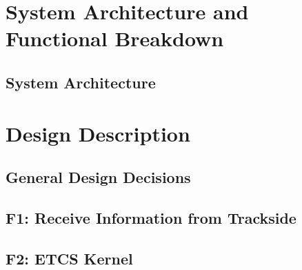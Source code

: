 \documentclass[oneside]{template/openetcs_report}
\begin{document}
\tableofcontents
\listoffigures
\listoftodos
\newpage

\linenumbers




\mainmatter

\setlength{\topsep}{0.5ex}
\setlength{\itemsep}{0ex}
\setlength{\parsep}{0ex}



\part{System Architecture and Functional Breakdown}

%

\chapter{System Architecture}






\part{Design Description}

\chapter{General Design Decisions}




\chapter{F1: Receive Information from Trackside}\label{s:F1}




\chapter{F2: ETCS Kernel}\label{s:F2}
\end{document}
